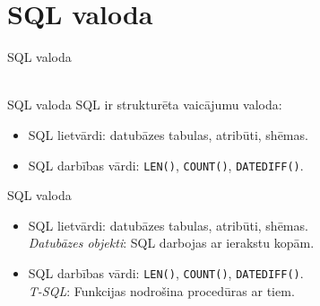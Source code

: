\documentclass{beamer}
\begin{document}
\section{SQL valoda}
  \begin{frame}{SQL valoda}
\vspace{-0.3cm}
    \centering 
     \\ \pause
    \vspace{0.4cm}
    \\ \pause
    \vspace{0.4cm} 
    \end{frame}

    \begin{frame}{SQL valoda}
      \vspace{-0.5cm}
      \hspace{1cm}
        SQL ir strukturēta vaicājumu valoda:
        \vspace{0.3cm}
        {
        \begin{itemize}
         \item[\textbullet] SQL lietvārdi: datubāzes tabulas, atribūti, shēmas.
        \item[\textbullet] SQL darbības vārdi: \texttt{LEN()}, \texttt{COUNT()}, \texttt{DATEDIFF()}.
 \end{itemize}}
    \end{frame}


    \begin{frame}{SQL valoda}
      \vspace{-0.5cm}
      \hspace{1cm}
        {
        \begin{itemize}
         \item[\textbullet] SQL lietvārdi: datubāzes tabulas, atribūti, shēmas.\\ \vspace{0.5cm}
        \hspace{2cm} \emph{Datubāzes objekti}: 
        SQL darbojas ar ierakstu kopām. \\ \pause \vspace{0.5cm}
        \item[\textbullet] SQL darbības vārdi: \texttt{LEN()}, \texttt{COUNT()}, \texttt{DATEDIFF()}. \\ \vspace{0.5cm}
        \hspace{2cm} \emph{T-SQL}: 
        Funkcijas nodrošina procedūras ar tiem. \\ 
 \end{itemize}}
 \end{frame}
 
\end{document}
